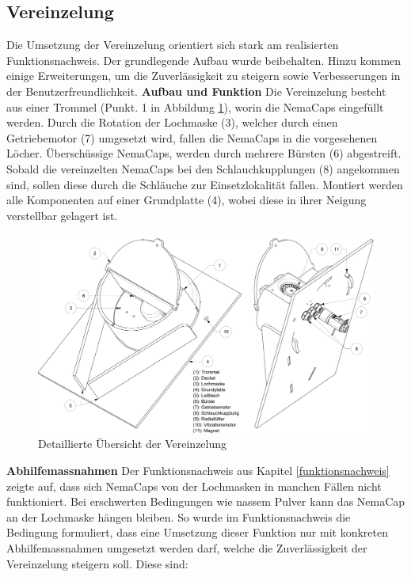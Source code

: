 \subsection{Vereinzelung}
Die Umsetzung der Vereinzelung orientiert sich stark am realisierten Funktionsnachweis. Der grundlegende Aufbau wurde beibehalten. Hinzu kommen einige Erweiterungen, um die Zuverlässigkeit zu steigern sowie Verbesserungen in der Benutzerfreundlichkeit.
\newline
\newline
\textbf{Aufbau und Funktion}
\newline
Die Vereinzelung besteht aus einer Trommel (Punkt. 1 in Abbildung \ref{fig:details_vereinzelung}), worin die NemaCaps eingefüllt werden. Durch die Rotation der Lochmaske (3), welcher durch einen Getriebemotor (7) umgesetzt wird, fallen die NemaCaps in die vorgesehenen Löcher. Überschüssige NemaCaps, werden durch mehrere Bürsten (6) abgestreift. Sobald die vereinzelten NemaCaps bei den Schlauchkupplungen (8) angekommen sind, sollen diese durch die Schläuche zur Einsetzlokalität fallen. Montiert werden alle Komponenten auf einer Grundplatte (4), wobei diese in ihrer Neigung verstellbar gelagert ist.
	\begin{figure}[H]
	\includegraphics[scale=0.45]{Illustrationen/6-Umsetzung/details_vereinzelung.jpg}
	\caption{Detaillierte Übersicht der Vereinzelung}
	\label{fig:details_vereinzelung}
	\end{figure}
\textbf{Abhilfemassnahmen}
\newline
Der Funktionsnachweis aus Kapitel \ref{funktionsnachweis} zeigte auf, dass sich NemaCaps von der Lochmasken in manchen Fällen nicht funktioniert. Bei erschwerten Bedingungen wie nassem Pulver kann das NemaCap an der Lochmaske hängen bleiben. So wurde im Funktionsnachweis die Bedingung formuliert, dass eine Umsetzung dieser Funktion nur mit konkreten Abhilfemassnahmen umgesetzt werden darf, welche die Zuverlässigkeit der Vereinzelung steigern soll. Diese sind:
